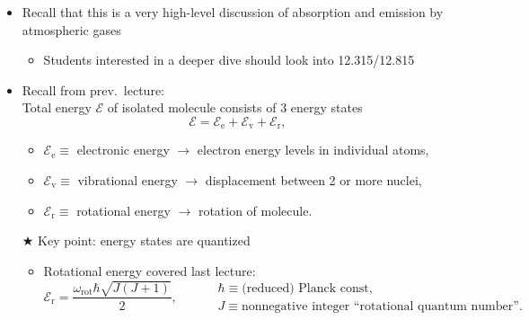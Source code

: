 \documentclass[11pt, oneside]{article}
\begin{document}
\begin{itemize}
	\item Recall that this is a very high-level discussion of absorption and emission by atmospheric gases
	\begin{itemize}
		\item[$\rightarrow$] Students interested in a deeper dive should look into 12.315/12.815
	\end{itemize}
	\item Recall from prev.\ lecture:\\
	Total energy $\mathcal{E}$ of isolated molecule consists of 3 energy states
	\begin{equation}
		\label{e:E}
		\mathcal{E} = \mathcal{E}_\mathrm{e} + \mathcal{E}_\mathrm{v} + \mathcal{E}_\mathrm{r},
	\end{equation}
	\begin{itemize}
		\item[] $\mathcal{E}_\mathrm{e} \equiv$ electronic energy $\rightarrow$ electron energy levels in individual atoms,
		\item[] $\mathcal{E}_\mathrm{v} \equiv$ vibrational energy $\rightarrow$ displacement between 2 or more nuclei,
		\item[] $\mathcal{E}_\mathrm{r} \equiv$ rotational energy $\rightarrow$ rotation of molecule.
	\end{itemize}
	$\bigstar$ Key point: energy states are quantized
	\begin{itemize}
		\item[--] Rotational energy covered last lecture:
		\begin{equation}
			\label{e:Er}
			\mathcal{E}_\mathrm{r} = \frac{\omega_\mathrm{rot}\hbar\sqrt{J(J+1)}}{2}, \qquad
			\begin{aligned}
				&\hbar \equiv \text{(reduced) Planck const},\\
				&J \equiv \text{nonnegative integer ``rotational quantum number''}.
			\end{aligned}
		\end{equation}
	\end{itemize}
\end{itemize}

\end{document}
